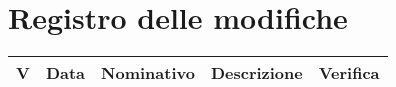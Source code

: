 \section*{Registro delle modifiche} %

\begin{longtable}{
		>{\centering}p{}	%
		>{\centering}p{}	%
		>{\centering}p{}	%
		>{}p{}			%
		>{\centering}p{} }	%
	
	\textbf{\color{white}V} &
	\textbf{\color{white}Data} &
	\textbf{\color{white}Nominativo} &
	\textbf{\color{white}Descrizione} &
	\textbf{\color{white}Verifica}
	\tabularnewline
	\endhead
	

\end{longtable}

